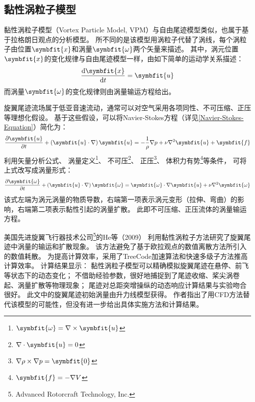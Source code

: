 \documentclass[doctor,openright,twoside,color]{buaathesis}
\begin{document}
\subsection{黏性涡粒子模型}\label{Viscous-Vortex-Particle-Method}
黏性涡粒子模型（Vortex Particle Model, VPM）与自由尾迹模型类似，也属于基于拉格朗日观点的分析模型。
所不同的是该模型用涡粒子代替了涡线，每个涡粒子由位置$\symbfit{x}$和涡量$\symbfit{\omega}$两个矢量来描述。
其中，涡元位置$\symbfit{x}$的变化规律与自由尾迹模型一样，由如下简单的运动学关系描述：
\begin{equation}\label{}
\frac{\mathrm{d} \symbfit{x}}{\mathrm{d} t}
=
\symbfit{u}
\end{equation}
而涡量$\symbfit{\omega}$的变化规律则由涡量输运方程给出。

旋翼尾迹流场属于低亚音速流动，通常可以对空气采用各项同性、不可压缩、正压等理想化假设。
基于这些假设，可以将Navier-Stokes方程（详见\ref{Navier-Stokes-Equation}）简化为：
\begin{equation}\label{}
\frac{\partial \symbfit{u}}{\partial t}
+
\left( \symbfit{u}\cdot\nabla \right) \symbfit{u}
=
-\frac{1}{\rho} \nabla p
+
\nu \nabla^2 \symbfit{u}
+
\symbfit{f}
\end{equation}
利用矢量分析公式、%
涡量定义\footnote{$\symbfit{\omega}=\nabla\times  \symbfit{u}$}、
不可压\footnote{$\nabla\cdot  \symbfit{u} = 0$}、
正压\footnote{$\nabla \rho \times \nabla p = \symbfit{0}$}、
体积力有势\footnote{$ \symbfit{f} = -\nabla V  $}等条件，
可将上式改写成涡量形式：
\begin{equation}\label{Vorticity-Transport-Equation}
\frac{\partial \symbfit{\omega}}{\partial t}
+
\left( \symbfit{u}\cdot\nabla \right) \symbfit{\omega}
=
\symbfit{\omega} \cdot \nabla\symbfit{u}
+
\nu \nabla^2 \symbfit{\omega}
\end{equation}
该式左端为涡元涡量的物质导数，右端第一项表示涡元变形（拉伸、弯曲）的影响，右端第二项表示黏性引起的涡量扩散。
此即不可压缩、正压流体的涡量输运方程。

美国先进旋翼飞行器技术公司\footnote{Advanced Rotorcraft Technology, Inc.}的He等（2009）
利用黏性涡粒子方法研究了旋翼尾迹中涡量的输运和扩散现象。
该方法避免了基于欧拉观点的数值离散方法所引入的数值耗散。
为提高计算效率，采用了TreeCode加速算法和快速多级子方法推高计算效率。
计算结果显示：
黏性涡粒子模型可以精确模拟旋翼尾迹在悬停、前飞等状态下的动态变化；
不借助经验参数，很好地捕捉到了尾迹收缩、桨尖涡卷起、涡量扩散等物理现象；
尾迹对总距突增操纵的动态响应计算结果与实验吻合很好。
此文中的旋翼尾迹初始涡量由升力线模型获得。
作者指出了用CFD方法替代该模型的可能性，但没有进一步给出具体实施方法和计算结果。
\end{document}
